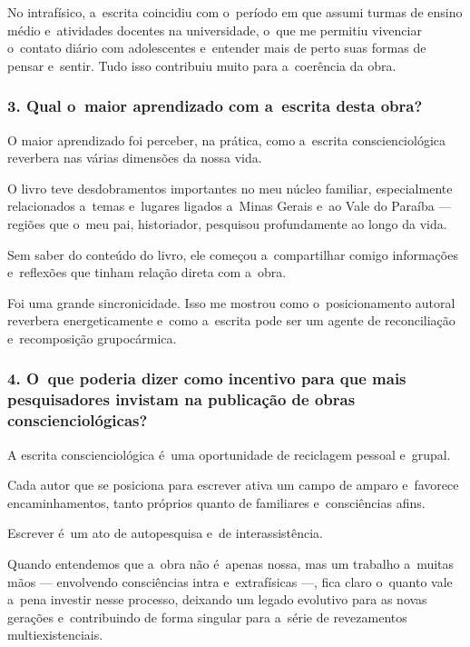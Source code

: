 \documentclass{gescons}
\begin{document}
\begin{multicols}{3}
No intrafísico, a~escrita coincidiu com o~período em que assumi turmas de ensino médio e~atividades docentes na universidade, o~que me permitiu vivenciar o~contato diário com adolescentes e~entender mais de perto suas formas de pensar e~sentir. Tudo isso contribuiu muito para a~coerência da obra.

\subsubsection{3. Qual o~maior aprendizado com a~escrita desta obra?}

O maior aprendizado foi perceber, na prática, como a~escrita conscienciológica reverbera nas várias dimensões da nossa vida.

O livro teve desdobramentos importantes no meu núcleo familiar, especialmente relacionados a~temas e~lugares ligados a~Minas Gerais e~ao Vale do Paraíba --- regiões que o~meu pai, historiador, pesquisou profundamente ao longo da vida.

Sem saber do conteúdo do livro, ele começou a~compartilhar comigo informações e~reflexões que tinham relação direta com a~obra.

Foi uma grande sincronicidade. Isso me mostrou como o~posicionamento autoral reverbera energeticamente e~como a~escrita pode ser um agente de reconciliação e~recomposição grupocármica.

\subsubsection{4. O~que poderia dizer como incentivo para que mais pesquisadores invistam na publicação de obras conscienciológicas?}

A escrita conscienciológica é~uma oportunidade de reciclagem pessoal e~grupal.

Cada autor que se posiciona para escrever ativa um campo de amparo e~favorece encaminhamentos, tanto próprios quanto de familiares e~consciências afins.

Escrever é~um ato de autopesquisa e~de interassistência.

Quando entendemos que a~obra não é~apenas nossa, mas um trabalho a~muitas mãos --- envolvendo consciências intra e~extrafísicas ---, fica claro o~quanto vale a~pena investir nesse processo, deixando um legado evolutivo para as novas gerações e~contribuindo de forma singular para a~série de revezamentos multiexistenciais.

    
    \end{multicols}
\end{document}
